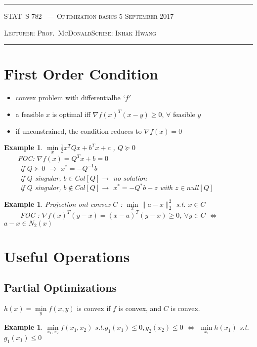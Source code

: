 \documentclass[10pt]{article}
\newcounter{lecnum}
\newtheorem{example}[ex]{Example}
\newcommand{\minl}{\min\limits}
\newcommand{\lecturer}{Prof.\ McDonald}
\newcommand{\scribe}{Inhak Hwang}
\newcommand{\chtitle}{Optimization basics}
\newcommand{\lecdate}{5 September 2017}
\begin{document}
\rule{6.5in}{1pt}

\textsc{STAT--S 782
        \hfill \thelecnum\ --- \chtitle
        \hfill \lecdate}

\textsc{Lecturer: \lecturer \hfill Scribe: \scribe}
\rule{6.5in}{1pt}



\section{First Order Condition}
\label{sec:terminology}

\begin{itemize}
  \item convex problem with differentialbe $`f'$
  \item a feasible $x$ is optimal iff $\nabla f(x)^{T}( x - y) \ge 0$, $\forall$ feasible $y$
  \item if unconstrained, the condition reduces to $\nabla f(x)  = 0 $
\end{itemize}


\begin{example}
  $\minl_x \frac{1}{2}x^{T}Q x + b^{T}x + c $ , $Q \succeq 0$ \\
      $\qquad$FOC: $\nabla f(x) = Q^{T}x + b = 0$  \\
	$\qquad$ if $Q \succ 0 $ $\rightarrow$ $x^{*} = -Q^{-1}b$ \\
	$\qquad$ if $Q$ singular, $b \in Col[Q] \rightarrow$ no solution \\
     $\qquad$ if $Q$ singular, $b \notin Col[Q] \rightarrow$ $x^{*} = -Q^{*}b + z $ with $z \in null[Q]$
\end{example}

\begin{example}
 Projection ont convex $C$ : $\min\limits_{x} \|a-x\|_{2}^{2}$ s.t. $x\in C$\\
$\qquad$ FOC : $\nabla f(x)^{T}(y-x) = (x - a)^{T}(y - x) \ge 0$, $\forall y\in C$ $\Leftrightarrow$ $a-x \in N_{2}(x)$
\end{example}


\section{Useful Operations}
\subsection{Partial Optimizations}
$h(x) = \min\limits_{y}f(x,y) $ is convex if $f$ is convex, and $C$ is convex.
\begin{example}
$\min\limits_{x_{1},x_{2}} f(x_{1},x_{2})$  $s.t. g_{1}(x_{1}) \le 0, g_{2}(x_{2}) \le 0$  $\Leftrightarrow$ $ \min\limits_{x_{1}}h(x_{1})$ s.t. $g_{1}(x_{1}) \le 0$
\end{example}
\end{document}
